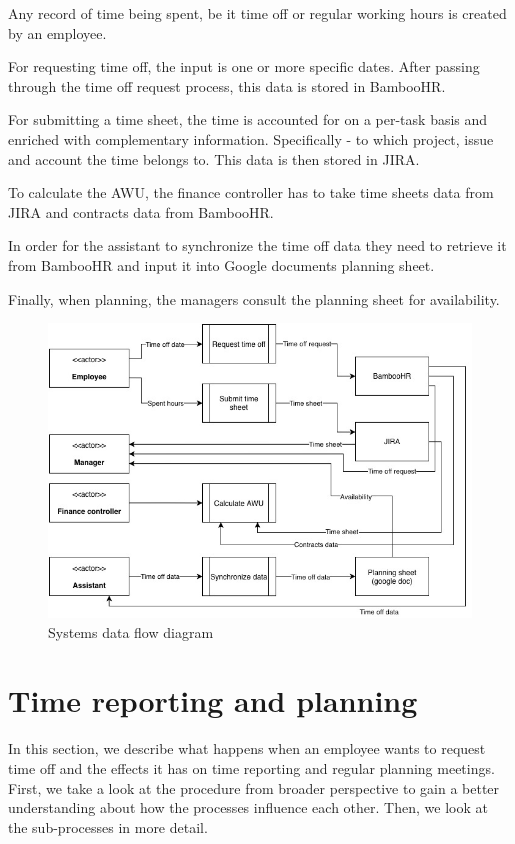 \documentclass[12pt,oneside]{fithesis2}
\begin{document}
Any record of time being spent, be it time off or regular working hours is created by an employee.

For requesting time off, the input is one or more specific dates. After passing through the time off request process, this data is stored in BambooHR.

For submitting a time sheet, the time is accounted for on a per-task basis and enriched with complementary information. Specifically - to which project, issue and account the time belongs to. This data is then stored in JIRA.

To calculate the AWU, the finance controller has to take time sheets data from JIRA and contracts data from BambooHR.

In order for the assistant to synchronize the time off data they need to retrieve it from BambooHR and input it into Google documents planning sheet.

Finally, when planning, the managers consult the planning sheet for availability.

\begin{figure}[H]
    \centering
    \includegraphics[width=\textwidth]{images/systems_dfd.jpg}
    \caption{Systems data flow diagram}
    \label{fig:systems_dfd}
\end{figure}

\section{Time reporting and planning}
In this section, we describe what happens when an employee wants to request time off and the effects it has on time reporting and regular planning meetings. First, we take a look at the procedure from broader perspective to gain a better understanding about how the processes influence each other. Then, we look at the sub-processes in more detail.
\end{document}

